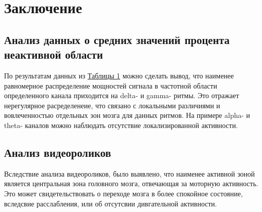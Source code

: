 \chapter*{Заключение}
\section*{Анализ данных о средних значений процента неактивной области}
По результатам данных из \hyperref[tab:table]{Таблицы 1} можно сделать вывод, что наименее равномерное распределение мощностей сигнала в частотной области определенного канала приходится на delta- и gamma- ритмы. Это отражает нерегулярное расределенеие, что связано с локальными различиями и вовлеченностью отдельных зон мозга для данных ритмов. На примере alpha- и theta- каналов можно наблюдать отсутствие локализированной активности.
\section*{Анализ видеороликов}
Вследствие анализа видеороликов, было выявлено, что наименее активной зоной является центральная зона головного мозга, отвечающая за моторную активность. Это может свидетельствовать о переходе мозга в более спокойное состояние, вследсвие расслабления, или об отсутсвии дивгательной активности.

\endinput